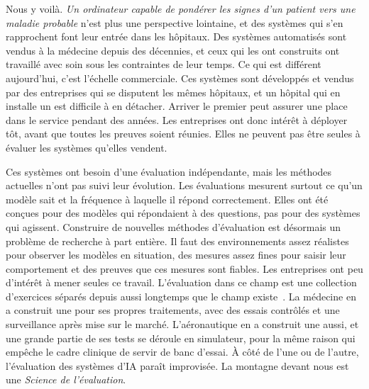Nous y voilà. \textit{Un ordinateur capable de pondérer les signes d'un patient vers
une maladie probable} n'est plus une perspective lointaine, et des systèmes qui s'en
rapprochent font leur entrée dans les hôpitaux. Des systèmes automatisés sont vendus à la
médecine depuis des décennies, et ceux qui les ont construits ont travaillé avec soin
sous les contraintes de leur temps. Ce qui est différent aujourd'hui, c'est l'échelle commerciale.
Ces systèmes sont développés et vendus par des entreprises qui se disputent les mêmes
hôpitaux, et un hôpital qui en installe un est difficile à en détacher. Arriver le
premier peut assurer une place dans le service pendant des années. Les entreprises ont
donc intérêt à déployer tôt, avant que toutes les preuves soient réunies. Elles ne
peuvent pas être seules à évaluer les systèmes qu'elles vendent.

Ces systèmes ont besoin d'une évaluation indépendante, mais les méthodes actuelles
n'ont pas suivi leur évolution. Les évaluations mesurent surtout ce qu'un modèle sait
et la fréquence à laquelle il répond correctement. Elles ont été conçues pour des
modèles qui répondaient à des questions, pas pour des systèmes qui agissent.
Construire de nouvelles méthodes d'évaluation est désormais un problème de recherche
à part entière. Il faut des environnements assez réalistes pour observer les modèles
en situation, des mesures assez fines pour saisir leur comportement et des preuves
que ces mesures sont fiables. Les entreprises ont peu d'intérêt à mener seules ce
travail. L'évaluation dans ce champ est une
collection d'exercices séparés depuis aussi longtemps que le champ
existe~\citep{truongkoyejo2026aims}. La médecine en a construit une pour ses propres
traitements, avec des essais contrôlés et une surveillance après mise sur le marché.
L'aéronautique en a construit une aussi, et une grande partie de ses tests se déroule en
simulateur, pour la même raison qui empêche le cadre clinique de servir de banc d'essai. À
côté de l'une ou de l'autre, l'évaluation des systèmes d'IA paraît improvisée. La
montagne devant nous est une \textit{Science de l'évaluation}.
